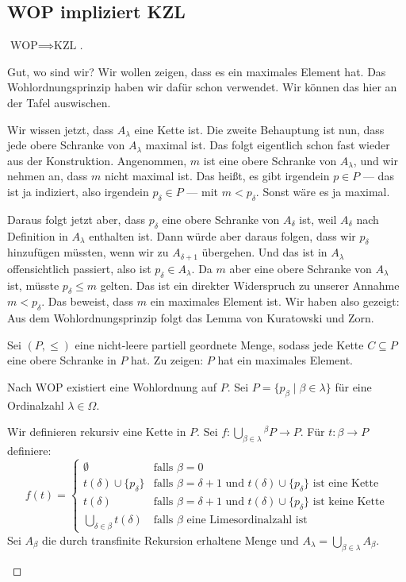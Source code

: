 \subsection{WOP impliziert KZL}

\begin{proof}[$\text{WOP} \implies \text{KZL}$]
\begin{spoken-clean}[00:52:08 - 00:54:00]
Gut, wo sind wir? Wir wollen zeigen, dass es ein maximales Element hat. Das Wohlordnungsprinzip haben wir dafür schon verwendet. Wir können das hier an der Tafel auswischen.

Wir wissen jetzt, dass $A_\lambda$ eine Kette ist. Die zweite Behauptung ist nun, dass jede obere Schranke von $A_\lambda$ maximal ist. Das folgt eigentlich schon fast wieder aus der Konstruktion. Angenommen, $m$ ist eine obere Schranke von $A_\lambda$, und wir nehmen an, dass $m$ nicht maximal ist. Das heißt, es gibt irgendein $p \in P$ --- das ist ja indiziert, also irgendein $p_\delta \in P$ --- mit $m < p_\delta$. Sonst wäre es ja maximal.
\end{spoken-clean}

\begin{spoken-clean}[00:54:00 - 00:56:45]
Daraus folgt jetzt aber, dass $p_\delta$ eine obere Schranke von $A_\delta$ ist, weil $A_\delta$ nach Definition in $A_\lambda$ enthalten ist. Dann würde aber daraus folgen, dass wir $p_\delta$ hinzufügen müssten, wenn wir zu $A_{\delta+1}$ übergehen. Und das ist in $A_\lambda$ offensichtlich passiert, also ist $p_\delta \in A_\lambda$. Da $m$ aber eine obere Schranke von $A_\lambda$ ist, müsste $p_\delta \le m$ gelten. Das ist ein direkter Widerspruch zu unserer Annahme $m < p_\delta$. Das beweist, dass $m$ ein maximales Element ist. Wir haben also gezeigt: Aus dem Wohlordnungsprinzip folgt das Lemma von Kuratowski und Zorn.
\end{spoken-clean}

\begin{math-stroke}
Sei $(P, \le)$ eine nicht-leere partiell geordnete Menge, sodass jede Kette $C \subseteq P$ eine obere Schranke in $P$ hat.
Zu zeigen: $P$ hat ein maximales Element.

Nach $\text{WOP}$ existiert eine Wohlordnung auf $P$.
Sei $P = \{ p_\beta \mid \beta \in \lambda \}$ für eine Ordinalzahl $\lambda \in \Omega$.

Wir definieren rekursiv eine Kette in $P$.
Sei $f: \bigcup_{\beta \in \lambda} {}^{\beta}P \to P$.
Für $t: \beta \to P$ definiere:
\[
f(t) = \begin{cases}
\emptyset & \text{falls } \beta = 0 \\
t(\delta) \cup \{p_\delta\} & \text{falls } \beta = \delta+1 \text{ und } t(\delta) \cup \{p_\delta\} \text{ ist eine Kette} \\
t(\delta) & \text{falls } \beta = \delta+1 \text{ und } t(\delta) \cup \{p_\delta\} \text{ ist keine Kette} \\
\bigcup_{\delta \in \beta} t(\delta) & \text{falls } \beta \text{ eine Limesordinalzahl ist}
\end{cases}
\]
Sei $A_\beta$ die durch transfinite Rekursion erhaltene Menge und $A_\lambda = \bigcup_{\beta \in \lambda} A_\beta$.


\end{math-stroke}
\end{proof}
